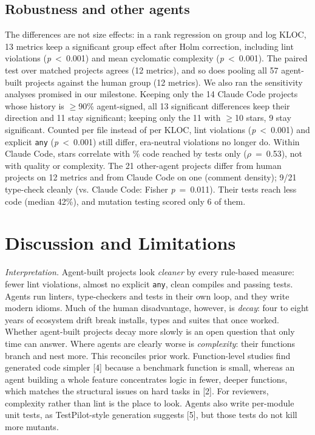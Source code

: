 \documentclass[10pt,conference]{IEEEtran}
\begin{document}
\subsection{Robustness and other agents}
The differences are not size effects: in a rank regression on group and log KLOC, 13 metrics keep a significant group effect after Holm correction, including lint violations (\emph{p}~\textless{}~0.001) and mean cyclomatic complexity (\emph{p}~\textless{}~0.001). The paired test over matched projects agrees (12 metrics), and so does pooling all 57 agent-built projects against the human group (12 metrics). We also ran the sensitivity analyses promised in our milestone. Keeping only the 14 Claude Code projects whose history is $\geq$90\% agent-signed, all 13 significant differences keep their direction and 11 stay significant; keeping only the 11 with $\geq$10 stars, 9 stay significant. Counted per file instead of per KLOC, lint violations (\emph{p}~\textless{}~0.001) and explicit \texttt{any} (\emph{p}~\textless{}~0.001) still differ, era-neutral violations no longer do. Within Claude Code, stars correlate with \% code reached by tests only ($\rho$~=~0.53), not with quality or complexity. The 21 other-agent projects differ from human projects on 12 metrics and from Claude Code on one (comment density); 9/21 type-check cleanly (vs. Claude Code: Fisher \emph{p}~=~0.011). Their tests reach less code (median 42\%), and mutation testing scored only 6 of them.

\section{Discussion and Limitations}
\emph{Interpretation.} Agent-built projects look \emph{cleaner} by every rule-based measure: fewer lint violations, almost no explicit \texttt{any}, clean compiles and passing tests. Agents run linters, type-checkers and tests in their own loop, and they write modern idioms. Much of the human disadvantage, however, is \emph{decay}: four to eight years of ecosystem drift break installs, types and suites that once worked. Whether agent-built projects decay more slowly is an open question that only time can answer. Where agents are clearly worse is \emph{complexity}: their functions branch and nest more. This reconciles prior work. Function-level studies find generated code simpler [4] because a benchmark function is small, whereas an agent building a whole feature concentrates logic in fewer, deeper functions, which matches the structural issues on hard tasks in [2]. For reviewers, complexity rather than lint is the place to look. Agents also write per-module unit tests, as TestPilot-style generation suggests [5], but those tests do not kill more mutants.
\end{document}

